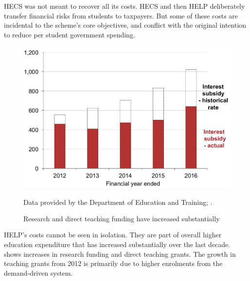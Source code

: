 \documentclass[embargoed]{grattan}
\begin{document}
\gls{HECS} was not meant to recover all its costs.
\gls{HECS} and then \gls{HELP} deliberately transfer financial risks from students to taxpayers.
But some of these costs are incidental to the scheme's core objectives, and conflict with the original intention to reduce per student government spending.

\begin{figure}
\caption{Research and direct teaching funding have increased substantially\label{fig:fig12-research-direct-teaching-funding-have-increased-substantially}}


\includegraphics[page=12]{atlas/Chartpack.pdf}

{Data provided by the Department of Education and Training; \textcites{Australia2014HigherEducationResearcha}{ABS2015ConsumerPriceIndex}.}
\end{figure}


\gls{HELP}'s costs cannot be seen in isolation.
They are part of overall higher education expenditure that has increased substantially over the last decade.
 shows increases in research funding and direct teaching grants.
The growth in teaching grants from 2012 is primarily due to higher enrolments from the demand-driven system.
\end{document}
